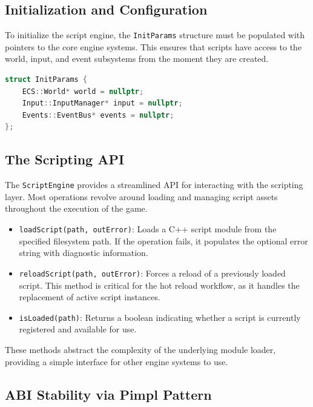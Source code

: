 \subsection{Initialization and Configuration}

To initialize the script engine, the \texttt{InitParams} structure must be populated with pointers to the core engine systems. This ensures that scripts have access to the world, input, and event subsystems from the moment they are created.

\begin{lstlisting}[language=C++, caption=ScriptEngine Initialization Parameters]
struct InitParams {
    ECS::World* world = nullptr;
    Input::InputManager* input = nullptr;
    Events::EventBus* events = nullptr;
};
\end{lstlisting}

\subsection{The Scripting API}

The \texttt{ScriptEngine} provides a streamlined API for interacting with the scripting layer. Most operations revolve around loading and managing script assets throughout the execution of the game.

\begin{itemize}
    \item \texttt{loadScript(path, outError)}: Loads a C++ script module from the specified filesystem path. If the operation fails, it populates the optional error string with diagnostic information.
    \item \texttt{reloadScript(path, outError)}: Forces a reload of a previously loaded script. This method is critical for the hot reload workflow, as it handles the replacement of active script instances.
    \item \texttt{isLoaded(path)}: Returns a boolean indicating whether a script is currently registered and available for use.
\end{itemize}

These methods abstract the complexity of the underlying module loader, providing a simple interface for other engine systems to use.

\subsection{ABI Stability via Pimpl Pattern}

